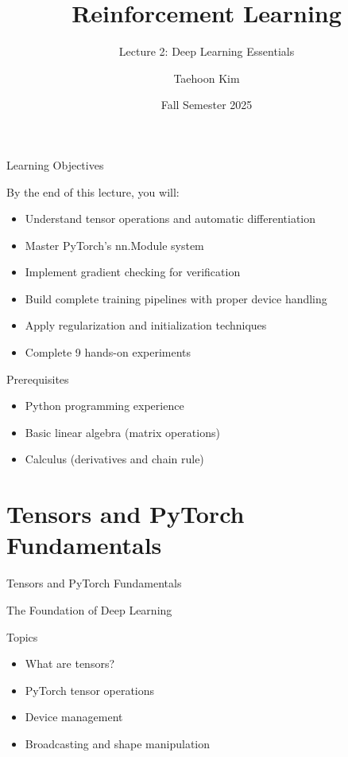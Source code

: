 \documentclass[aspectratio=169,10pt]{beamer}
\title{Reinforcement Learning}
\subtitle{Lecture 2: Deep Learning Essentials}
\author{Taehoon Kim}
\institute{Sogang University MIMIC Lab \\ \url{https://mimic-lab.com}}
\date{Fall Semester 2025}
\begin{document}

\frame{\titlepage}

\begin{frame}{Learning Objectives}
\begin{block}{By the end of this lecture, you will:}
\begin{itemize}
    \item Understand tensor operations and automatic differentiation
    \item Master PyTorch's nn.Module system
    \item Implement gradient checking for verification
    \item Build complete training pipelines with proper device handling
    \item Apply regularization and initialization techniques
    \item Complete 9 hands-on experiments
\end{itemize}
\end{block}

\begin{alertblock}{Prerequisites}
\begin{itemize}
    \item Python programming experience
    \item Basic linear algebra (matrix operations)
    \item Calculus (derivatives and chain rule)
\end{itemize}
\end{alertblock}
\end{frame}

\section{Tensors and PyTorch Fundamentals}

\begin{frame}{Tensors and PyTorch Fundamentals}
\begin{center}
\Large{The Foundation of Deep Learning}
\end{center}

\begin{block}{Topics}
\begin{itemize}
    \item What are tensors?
    \item PyTorch tensor operations
    \item Device management
    \item Broadcasting and shape manipulation
\end{itemize}
\end{block}
\end{frame}
\end{document}
